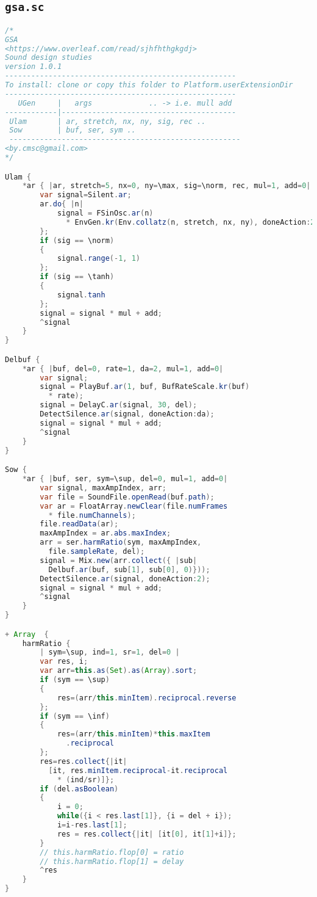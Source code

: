 \subsection{\texttt{gsa.sc}}
\label{gsasc}

\begin{lstlisting}[basicstyle=\footnotesize\ttfamily,language=Java]
/*
GSA
<https://www.overleaf.com/read/sjhfhthgkgdj>
Sound design studies
version 1.0.1
-----------------------------------------------------
To install: clone or copy this folder to Platform.userExtensionDir
-----------------------------------------------------
   UGen     |   args             .. -> i.e. mull add
------------|----------------------------------------
 Ulam       | ar, stretch, nx, ny, sig, rec ..
 Sow        | buf, ser, sym ..
 -----------------------------------------------------
<by.cmsc@gmail.com>
*/

Ulam {
	*ar { |ar, stretch=5, nx=0, ny=\max, sig=\norm, rec, mul=1, add=0|
		var signal=Silent.ar;
		ar.do{ |n|
			signal = FSinOsc.ar(n) 
			  * EnvGen.kr(Env.collatz(n, stretch, nx, ny), doneAction:2) + signal;
		};
		if (sig == \norm)
		{
			signal.range(-1, 1)
		};
		if (sig == \tanh)
		{
			signal.tanh
		};
		signal = signal * mul + add;
		^signal
	}
}

Delbuf {
	*ar { |buf, del=0, rate=1, da=2, mul=1, add=0|
		var signal;
		signal = PlayBuf.ar(1, buf, BufRateScale.kr(buf)
		  * rate);
		signal = DelayC.ar(signal, 30, del);
		DetectSilence.ar(signal, doneAction:da);
		signal = signal * mul + add;
		^signal
	}
}

Sow {
	*ar { |buf, ser, sym=\sup, del=0, mul=1, add=0|
		var signal, maxAmpIndex, arr;
		var file = SoundFile.openRead(buf.path);
		var ar = FloatArray.newClear(file.numFrames 
		  * file.numChannels);
		file.readData(ar);
		maxAmpIndex = ar.abs.maxIndex;
		arr = ser.harmRatio(sym, maxAmpIndex,
		  file.sampleRate, del);
		signal = Mix.new(arr.collect({ |sub| 
		  Delbuf.ar(buf, sub[1], sub[0], 0)}));
		DetectSilence.ar(signal, doneAction:2);
		signal = signal * mul + add;
		^signal
	}
}

+ Array  {
	harmRatio {
		| sym=\sup, ind=1, sr=1, del=0 |
		var res, i;
		var arr=this.as(Set).as(Array).sort;
		if (sym == \sup)
		{
			res=(arr/this.minItem).reciprocal.reverse
		};
		if (sym == \inf)
		{
			res=(arr/this.minItem)*this.maxItem
			  .reciprocal
		};
		res=res.collect{|it| 
		  [it, res.minItem.reciprocal-it.reciprocal
		    * (ind/sr)]};
		if (del.asBoolean)
		{
			i = 0;
			while({i < res.last[1]}, {i = del + i});
			i=i-res.last[1];
			res = res.collect{|it| [it[0], it[1]+i]};
		}
		// this.harmRatio.flop[0] = ratio
		// this.harmRatio.flop[1] = delay
		^res
	}
}
\end{lstlisting} 